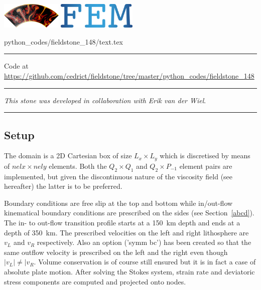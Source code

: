 \includegraphics[height=1.25cm]{images/pictograms/aspect_logo}
\includegraphics[height=1.25cm]{images/pictograms/FEM}


\begin{flushright} {\tiny {\color{gray} python\_codes/fieldstone\_148/text.tex}} \end{flushright}



\par\noindent\rule{\textwidth}{0.4pt}

\begin{center}
Code at \url{https://github.com/cedrict/fieldstone/tree/master/python_codes/fieldstone_148}
\end{center}

\par\noindent\rule{\textwidth}{0.4pt}

{\sl This stone was developed in collaboration with Erik van der Wiel}. 

\par\noindent\rule{\textwidth}{0.4pt}


\subsection*{Setup}

The domain is a 2D Cartesian box of size $L_x \times L_y$ which is discretised by means of 
$nelx \times nely$ elements. Both the $Q_2\times Q_1$ and $Q_2 \times P_{-1}$
element pairs are implemented, but given the discontinuous nature of the viscosity
field (see hereafter) the latter is to be preferred. 

Boundary conditions are free slip at the top and bottom while in/out-flow
kinematical boundary conditions are prescribed on the sides (see Section~\ref{abcd}). 
The in- to out-flow transition profile starts at a 150~\si{\km} depth and ends at a depth of 350~\si{\km}.
The prescribed velocities on the left and right lithosphere are $v_L$ and $v_R$ respectively.
Also an option ('symm bc') has been created so that the same outflow velocity is prescribed 
on the left and the right even though $|v_L| \neq |v_R$. Volume conservation is of course 
still ensured but it is in fact a case of absolute plate motion.
After solving the Stokes system, strain rate and deviatoric stress components are 
computed and projected onto nodes.

